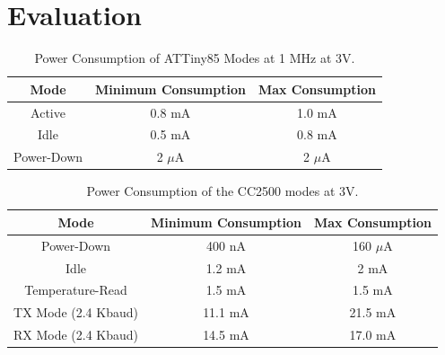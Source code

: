 \section{Evaluation}
\label{section:evaluation}

%
%
\begin{table}%
  \begin{center}
  
  \begin{tabular}{| c | c | c |}

  \hline
  \textbf{Mode} & \textbf{Minimum Consumption} & \textbf{Max Consumption} \\
  \hline
  Active      & 0.8 mA & 1.0 mA \\
  Idle        & 0.5 mA & 0.8 mA \\
  Power-Down  & 2 $\mu$A & 2 $\mu$A \\
  \hline
  
  \end{tabular}
  \end{center}
  \caption{Power Consumption of ATTiny85 Modes at 1 MHz at 3V.
  \label{table:attiny85_power}  
  }
\end{table}

%
%
\begin{table}%
  \begin{center}
  
  \begin{tabular}{| c | c | c |}

  \hline
  \textbf{Mode} & \textbf{Minimum Consumption} & \textbf{Max Consumption} \\
  \hline
  Power-Down        & 400 nA & 160 $\mu$A \\
  Idle              & 1.2 mA & 2 mA \\
  Temperature-Read  & 1.5 mA & 1.5 mA \\
  TX Mode (2.4 Kbaud) & 11.1 mA & 21.5 mA \\
  RX Mode (2.4 Kbaud) & 14.5 mA & 17.0 mA \\
  \hline
  
  \end{tabular}  
  \end{center}
  \caption{Power Consumption of the CC2500 modes at 3V.
  \label{table:cc2500_power}  
  }
\end{table}

